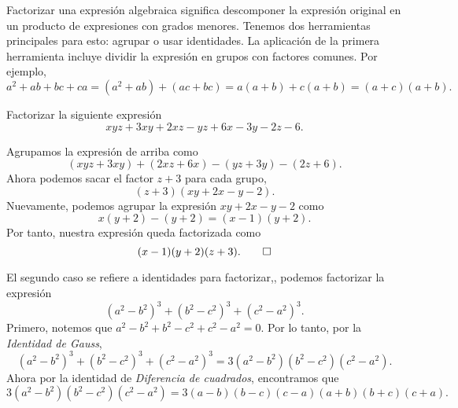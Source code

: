 Factorizar una expresión algebraica significa descomponer la expresión original en un producto de expresiones con grados menores.
Tenemos dos herramientas principales para esto: agrupar o usar identidades.
La aplicación de la primera herramienta incluye dividir la expresión en grupos con factores comunes.
Por ejemplo,
\[
    a^2 + ab + bc + ca = (a^2 + ab) + (ac + bc) = a(a + b) + c(a + b) = (a + c)(a + b).
\]

\begin{example}
    Factorizar la siguiente expresión
    \[
        xyz + 3xy + 2xz - yz + 6x - 3y - 2z - 6.
    \]
\end{example}
\begin{solution}
    Agrupamos la expresión de arriba como
    \[
        (xyz + 3xy) + (2xz + 6x) - (yz + 3y) - (2z + 6).
    \]
    Ahora podemos sacar el factor $z + 3$ para cada grupo,
    \[
        (z + 3)(xy + 2x - y - 2).
    \]
    Nuevamente, podemos agrupar la expresión $xy + 2x - y - 2$ como
    \[
        x(y + 2) - (y + 2) = (x - 1)(y + 2).
    \]
    Por tanto, nuestra expresión queda factorizada como
    \[
        (x - 1)(y + 2)(z + 3). \qedhere
    \]
\end{solution}

El segundo caso se refiere a identidades para factorizar,\eg, podemos factorizar la expresión
\[
    (a^2 - b^2)^3 + (b^2 - c^2)^3 + (c^2 - a^2)^3.
\]
Primero, notemos que $a^2 - b^2 + b^2 - c^2 + c^2 - a^2 = 0$.
Por lo tanto, por la \textit{Identidad de Gauss},
\[
    (a^2 - b^2)^3 + (b^2 - c^2)^3 + (c^2 - a^2)^3 = 3 (a^2 - b^2)(b^2 - c^2)(c^2 - a^2).
\]
Ahora por la identidad de \textit{Diferencia de cuadrados}, encontramos que
\[
    3 (a^2 - b^2)(b^2 - c^2)(c^2 - a^2) = 3 (a - b)(b - c)(c - a) (a + b)(b + c)(c + a).
\]


